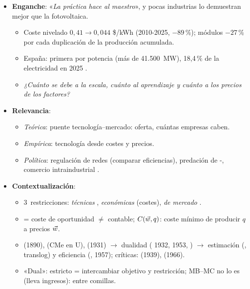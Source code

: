 \documentclass{article}
\begin{document}
\cabecerarepaso
\begin{columnas}

\begin{itemize}
\item \textbf{Enganche}: «\emph{La práctica hace al maestro}», y pocas industrias lo demuestran mejor que la fotovoltaica.
  \begin{itemize}
  \item Coste nivelado $0{,}41\to0{,}044$ \$/kWh (2010-2025, $-89$\,\%); módulos $-27$\,\% por cada duplicación de la producción acumulada.
  \item España: primera por potencia (más de 41.500~MW), 18,4\,\% de la electricidad en 2025 .
  \item \emph{¿Cuánto se debe a la escala, cuánto al aprendizaje y cuánto a los precios de los factores?}
  \end{itemize}
\item \textbf{Relevancia}:
  \begin{itemize}
  \item \emph{Teórica}: puente tecnología--mercado: oferta, cuántas empresas caben.
  \item \emph{Empírica}: tecnología desde costes y precios.
  \item \emph{Política}: regulación de redes (comparar eficiencias), predación de -, comercio intraindustrial .
  \end{itemize}
\item \textbf{Contextualización}:
  \begin{itemize}
  \item 3~restricciones: \emph{técnicas} , \emph{económicas} (costes), \emph{de mercado} .
  \item {} = coste de oportunidad $\neq$ contable;  $C(\vec{w},q)$: coste mínimo de producir $q$ a precios $\vec{w}$.
  \item {} (1890),  (CMe en U),  (1931) $\to$ dualidad ( 1932,  1953, ) $\to$ estimación (, translog) y eficiencia (, 1957); críticas:  (1939),  (1966).
  \item «Dual»: estricto = intercambiar objetivo y restricción; MB--MC no lo es (lleva ingresos): entre comillas.

\end{itemize}
\end{itemize}
\end{columnas}
\end{document}
